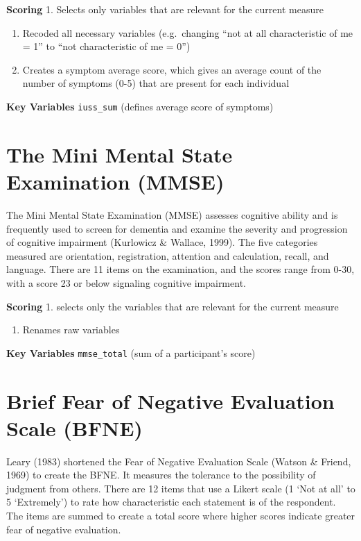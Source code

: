 \documentclass[
]{book}
\providecommand{\tightlist}{%
  \setlength{\itemsep}{0pt}\setlength{\parskip}{0pt}}
\begin{document}
\textbf{Scoring} 1. Selects only variables that are relevant for the current
measure

\begin{enumerate}
\def\labelenumi{\arabic{enumi}.}
\setcounter{enumi}{1}
\item
  Recoded all necessary variables (e.g.~changing ``not at all
  characteristic of me = 1'' to ``not characteristic of me = 0'')
\item
  Creates a symptom average score, which gives an average count of the
  number of symptoms (0-5) that are present for each individual
\end{enumerate}

\textbf{Key Variables} \texttt{iuss\_sum} (defines average score of symptoms)

\section{The Mini Mental State Examination (MMSE)}\label{the-mini-mental-state-examination-mmse}

The Mini Mental State Examination (MMSE) assesses cognitive ability and
is frequently used to screen for dementia and examine the severity and
progression of cognitive impairment (Kurlowicz \& Wallace, 1999). The
five categories measured are orientation, registration, attention and
calculation, recall, and language. There are 11 items on the
examination, and the scores range from 0-30, with a score 23 or below
signaling cognitive impairment.

\textbf{Scoring} 1. selects only the variables that are relevant for the
current measure

\begin{enumerate}
\def\labelenumi{\arabic{enumi}.}
\setcounter{enumi}{1}
\tightlist
\item
  Renames raw variables
\end{enumerate}

\textbf{Key Variables} \texttt{mmse\_total} (sum of a participant's score)

\section{Brief Fear of Negative Evaluation Scale (BFNE)}\label{brief-fear-of-negative-evaluation-scale-bfne}

Leary (1983) shortened the Fear of Negative Evaluation Scale (Watson \&
Friend, 1969) to create the BFNE. It measures the tolerance to the
possibility of judgment from others. There are 12 items that use a
Likert scale (1 `Not at all' to 5 `Extremely') to rate how
characteristic each statement is of the respondent. The items are summed
to create a total score where higher scores indicate greater fear of
negative evaluation.
\end{document}
